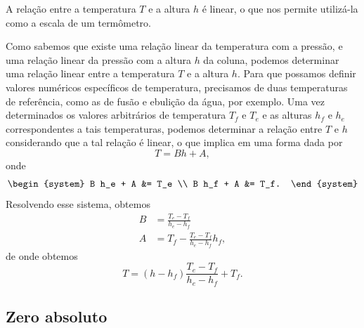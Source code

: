 \begin{marginfigure}[2cm]
\centering
{}
\caption{A relação entre a temperatura $T$ e a altura $h$ é linear, o que nos permite utilizá-la como a escala de um termômetro.}
\end{marginfigure}

Como sabemos que existe uma relação linear da temperatura com a pressão, e uma relação linear da pressão com a altura $h$ da coluna, podemos determinar uma relação linear entre a temperatura $T$ e a altura $h$. Para que possamos definir valores numéricos específicos de temperatura, precisamos de duas temperaturas de referência, como as de fusão e ebulição da água, por exemplo. Uma vez determinados os valores arbitrários de temperatura $T_f$ e $T_e$ e as alturas $h_f$ e $h_e$ correspondentes a tais temperaturas, podemos determinar a relação entre $T$ e $h$ considerando que a tal relação é linear, o que implica em uma forma dada por
\begin{equation}
    T = Bh + A,
\end{equation}
%
onde
\begin{equation}
\begin{system} B h_e + A &= T_e \\ B h_f + A &= T_f. \end{system}
\end{equation}
%
Resolvendo esse sistema, obtemos
\begin{align}
    B &= \frac{T_e - T_f}{h_e - h_f} \\
    A &= T_f - \frac{T_e - T_f}{h_e - h_f} h_f,
\end{align}
%
de onde obtemos
\begin{equation}
    T = (h - h_f)\frac{T_e - T_f}{h_e - h_f} + T_f.
\end{equation}
 
\subsection{Zero absoluto}

